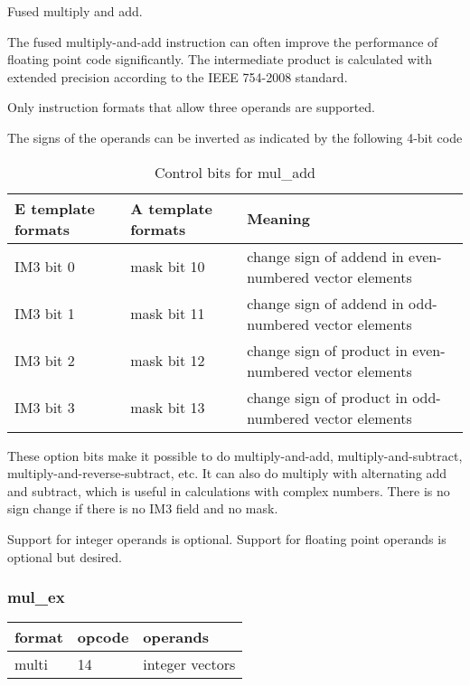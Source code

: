 \documentclass[forwardcom.tex]{subfiles}
\begin{document}
Fused multiply and add.
\vspace{2mm}

The fused multiply-and-add instruction can often improve the performance of floating point code significantly. The intermediate product is calculated with extended precision according to the IEEE 754-2008 standard.
\vspace{2mm}

Only instruction formats that allow three operands are supported.
\vspace{2mm}

The signs of the operands can be inverted as indicated by the following 4-bit code

\begin{longtable} {|p{20mm}|p{20mm}|p{75mm}|}
\caption{Control bits for mul\_add} 
\label{table:ControlBitsForMulAdd} \\
\endfirsthead
\endhead
\hline
\bfseries E template formats & \bfseries A template formats & \bfseries Meaning   \\
\hline
IM3 bit 0 & mask bit 10 & change sign of addend in even-numbered vector elements \\
IM3 bit 1 & mask bit 11 & change sign of addend in odd-numbered vector elements \\
IM3 bit 2 & mask bit 12 & change sign of product in even-numbered vector elements \\
IM3 bit 3 & mask bit 13 & change sign of product in odd-numbered vector elements \\
\hline
\end{longtable}

\vspace{2mm}
These option bits make it possible to do multiply-and-add, multiply-and-subtract, multiply-and-reverse-subtract, etc. It can also do multiply with alternating add and subtract, which is useful in calculations with complex numbers. 
There is no sign change if there is no IM3 field and no mask. 

\vspace{2mm}
Support for integer operands is optional. Support for floating point operands is optional but desired.

\subsubsection{mul\_ex}
\label{table:mulExInstruction}
\begin{tabular}{|p{12mm}|p{12mm}|p{110mm}|}
\hline
\bfseries format & \bfseries opcode & \bfseries operands \\ \hline
multi & 14 & integer vectors \\ \hline
\end{tabular}
\vspace{2mm}
\end{document}
